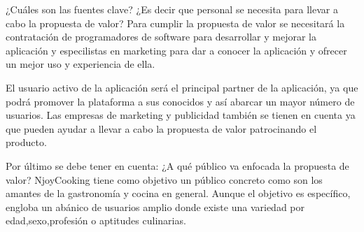 \vspace{5 mm}

¿Cuáles son las fuentes clave? ¿Es decir que personal se necesita para llevar a cabo la propuesta de valor? Para cumplir la propuesta de valor se necesitará la contratación de programadores de software para desarrollar y mejorar la aplicación y especilistas en marketing para dar a conocer la aplicación y ofrecer un mejor uso y experiencia de ella.

\vspace{5 mm}

El usuario activo de la aplicación será el principal partner de la aplicación, ya que podrá promover la plataforma a sus conocidos y así abarcar un mayor número de usuarios. Las empresas de marketing y publicidad también se tienen en cuenta ya que pueden ayudar a llevar a cabo la propuesta de valor patrocinando el producto.


\vspace{5 mm}

Por último se debe tener en cuenta: ¿A qué público va enfocada la propuesta de valor? NjoyCooking tiene como objetivo un público concreto como son los amantes de la gastronomía y cocina en general. Aunque el objetivo es específico, engloba un abánico de usuarios amplio donde existe una variedad por edad,sexo,profesión o aptitudes culinarias.
